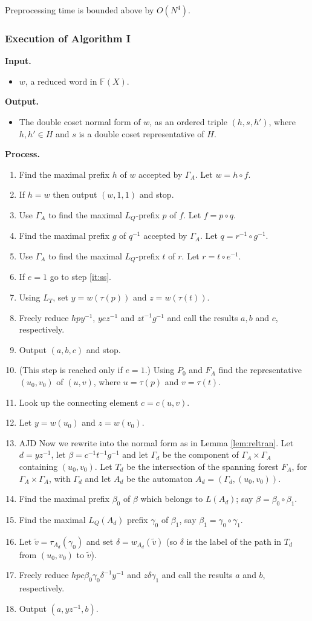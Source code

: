\documentclass[a4paper,12pt]{article}
\renewcommand{\b}{\beta }
\newcommand{\G}{\Gamma }
\newcommand{\g}{\gamma }
\renewcommand{\d}{\delta }
\renewcommand{\t}{\tau }
\numberwithin{equation}{section}
\numberwithin{figure}{section}
\newcommand{\FF}{\ensuremath{\mathbb{F}}}
\newcommand{\be}{\begin{enumerate}}
\newcommand{\ee}{\end{enumerate}}
\newcommand{\biz}{\begin{itemize}}
\newcommand{\eiz}{\end{itemize}}
\newenvironment{ajd1}{\noindent\color{red} AJD }{}
\newcommand{\ajd}[1]{\begin{ajd1} #1 \end{ajd1}}
\begin{document}
\begin{comp}
Preprocessing time is bounded above by $O(N^4)$.
\end{comp}
\subsubsection{Execution of Algorithm I}\label{sub:alg1ex}
\noindent\textbf{Input.}
\biz
\item $w$, a reduced word in $\FF(X)$.
\eiz
\noindent\textbf{Output.}
\biz
\item The double coset normal form of $w$, as an ordered triple
$(h,s,h')$, where $h,h'\in H$ and $s$ is a double coset representative
of $H$.
\eiz
\noindent\textbf{Process.}
\be[{B}1]
\item\label{it:alg1_1} Find the maximal prefix $h$ of $w$ accepted by $\G_A$.
Let $w=h\circ f$.
\item If $h=w$ then output $(w,1,1)$ and stop. 
\item Use $\G_A$ to find the maximal $L_Q$-prefix $p$ of $f$.
Let $f=p\circ q$.
\item Find the maximal prefix $g$ of $q^{-1}$ accepted by $\G_A$.
Let $q=r^{-1}\circ g^{-1}$.
\item Use $\G_A$ to find the maximal $L_Q$-prefix $t$ of $r$.
Let $r=t\circ e^{-1}$.
\item If $e=1$ go to step \ref{it:ss}.
\item Using $L_T$, set $y=w(\t(p))$ and $z=w(\t(t))$.
\item Freely reduce $hpy^{-1}$, $yez^{-1}$ and $zt^{-1}g^{-1}$ and
call the results   $a, b$ and $c$, respectively.
\item\label{it:dc1} Output $(a,b,c)$ and stop.
\item\label{it:ss} (This step is reached only if $e= 1$.)
 Using $P_0$ and $F_A$ find the representative $(u_0,v_0)$ of $(u,v)$, where
$u=\t(p)$ and $v=\t(t)$.
\item Look up the connecting element $c=c(u,v)$.
\item\label{it:dc2} Let $y=w(u_0)$ and $z=w(v_0)$.
\item \ajd{Now we rewrite into the normal form as in 
Lemma \ref{lem:reltran}.}
 Let
$d=yz^{-1}$, let $\b=c^{-1}t^{-1}g^{-1}$ and let $\G_d$ be the component
of $\G_A\times \G_A$ containing $(u_0,v_0)$. Let $T_d$ be the intersection
of the spanning forest $F_A$, for $\G_A\times \G_A$, with $\G_d$ and 
let $A_d$ be the automaton $A_d=(\G_d,(u_0,v_0))$.
\item Find the maximal prefix $\b_0$ of $\b$ which belongs to $L(A_d)$;
say $\b=\b_0\circ \b_1$. 
\item Find the maximal $L_Q(A_d)$ prefix $\g_0$ of $\b_1$, say 
$\b_1=\g_0\circ \g_1$. 
\item Let $\tilde v=\t_{A_d}(\g_0)$ and set $\d=w_{A_d}(\tilde v)$ 
(so $\d$ is the
label of the path in $T_d$ from $(u_0,v_0)$ to $\tilde v$). 
\item Freely reduce $hpc\b_0\g_0\d^{-1}y^{-1}$ 
and $z\d\g_1$ and call the
results $a$ and $b$, respectively.
\item\label{it:alg1_end} Output $(a,yz^{-1},b)$.
\ee
\end{document}
